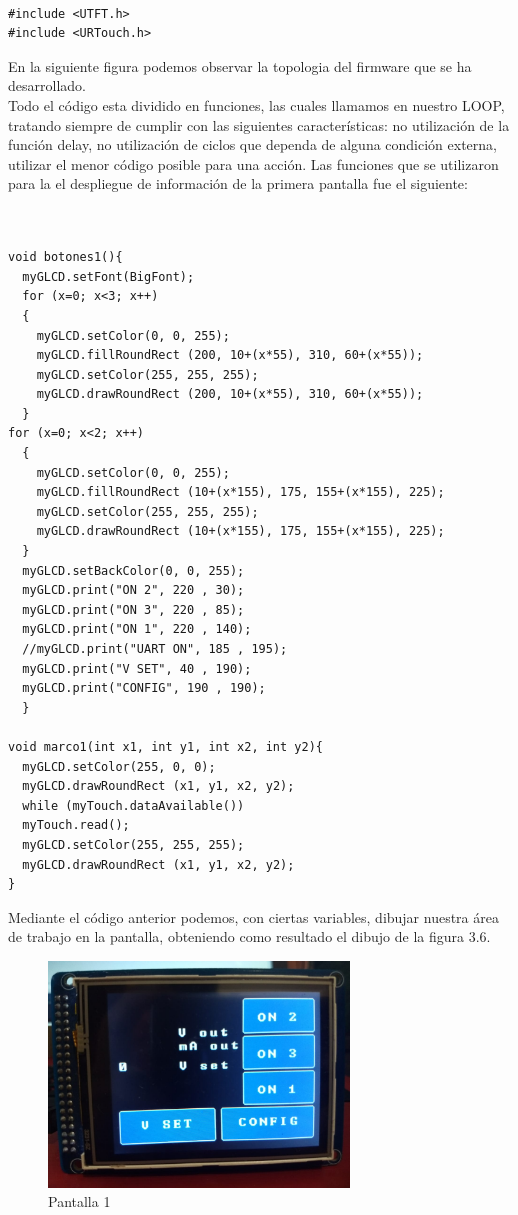 \begin{verbatim}

#include <UTFT.h>
#include <URTouch.h>

\end{verbatim}

En la siguiente figura podemos observar la topologia del firmware que se ha desarrollado.\\

Todo el código esta dividido en funciones, las cuales llamamos en nuestro LOOP, tratando siempre de cumplir con las siguientes características: no utilización de la función delay, no utilización de ciclos que dependa de alguna condición externa, utilizar el menor código posible para una acción. Las funciones que se utilizaron para la el despliegue de información de la primera pantalla fue el siguiente:


\begin{verbatim}

 
void botones1(){ 
  myGLCD.setFont(BigFont); 
  for (x=0; x<3; x++)
  {
    myGLCD.setColor(0, 0, 255);
    myGLCD.fillRoundRect (200, 10+(x*55), 310, 60+(x*55));
    myGLCD.setColor(255, 255, 255);
    myGLCD.drawRoundRect (200, 10+(x*55), 310, 60+(x*55));
  }
for (x=0; x<2; x++)
  {
    myGLCD.setColor(0, 0, 255);
    myGLCD.fillRoundRect (10+(x*155), 175, 155+(x*155), 225);
    myGLCD.setColor(255, 255, 255);
    myGLCD.drawRoundRect (10+(x*155), 175, 155+(x*155), 225);
  }
  myGLCD.setBackColor(0, 0, 255);
  myGLCD.print("ON 2", 220 , 30);
  myGLCD.print("ON 3", 220 , 85);
  myGLCD.print("ON 1", 220 , 140);
  //myGLCD.print("UART ON", 185 , 195);
  myGLCD.print("V SET", 40 , 190);
  myGLCD.print("CONFIG", 190 , 190);
  }
  
void marco1(int x1, int y1, int x2, int y2){ 
  myGLCD.setColor(255, 0, 0);
  myGLCD.drawRoundRect (x1, y1, x2, y2);
  while (myTouch.dataAvailable())
  myTouch.read();
  myGLCD.setColor(255, 255, 255);
  myGLCD.drawRoundRect (x1, y1, x2, y2);
}
\end{verbatim}

Mediante el código anterior podemos, con ciertas variables, dibujar nuestra área de trabajo en la pantalla, obteniendo como resultado el dibujo de la figura 3.6.

\begin{figure}[H]
\centering
\includegraphics[width=8cm]{Capitulo3/figs/pantalla1.jpg}
\caption{Pantalla 1}
\end{figure}

